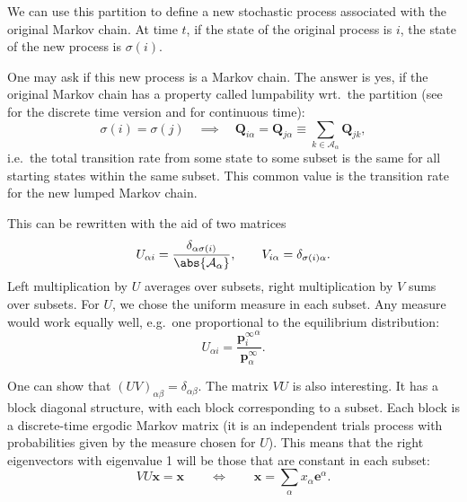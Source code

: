 \documentclass[9pt,twocolumn,twoside,lineno]{pnas-new}
\newcommand{\eg}{e.g.\ }
\newcommand{\ie}{i.e.\ }
\newcommand{\wrt}{wrt.\ }
\newcommand{\means}{\Longleftrightarrow}
\newcommand{\onev}{\mathbf{e}}
\newcommand{\MM}{\mathbf{Q}}
\newcommand{\prob}{\mathbf{p}}
\newcommand{\eq}{\prob^\infty}
\newcommand{\CA}{\mathcal{A}}
\begin{document}
\begin{strip}
We can use this partition to define a new stochastic process associated with the original Markov chain.
At time $t$, if the state of the original process is $i$, the state of the new process is $\sigma(i)$.

One may ask if this new process is a Markov chain.
The answer is yes, if the original Markov chain has a property called lumpability \wrt the partition
(see \cite[\S6.3]{kemeny1960finite} for the discrete time version and \cite{burke1958markovian,Ball1993Lumpability} for continuous time):
%
\begin{equation}\label{eq:lump}
  \sigma(i)=\sigma(j)
  \quad\implies \quad
  \MM_{i\alpha}=\MM_{j\alpha} \equiv \sum_{k\in\CA_\alpha} \MM_{jk},
\end{equation}
%
\ie the total transition rate from some state to some subset is the same for all starting states within the same subset.
This common value is the transition rate for the new lumped Markov chain.

This can be rewritten with the aid of two matrices
%
\begin{equation}\label{eq:lumpmats}
  U_{\alpha i} = \frac{\delta_{\alpha\sigma(i)}}{\abs{\CA_\alpha}},
  \qquad
  V_{i\alpha} = \delta_{\sigma(i)\alpha}.
\end{equation}
%
Left multiplication by $U$ averages over subsets, right multiplication by $V$ sums over subsets.
For $U$, we chose the uniform measure in each subset. Any measure would work equally well, \eg one proportional to the equilibrium distribution:
%
\begin{equation}\label{eq:altlumpmats}
  U_{\alpha i} = \frac{{\eq_i}^\alpha}{\eq_\alpha}.
\end{equation}
%

One can show that $(UV)_{\alpha\beta}=\delta_{\alpha\beta}$.
The matrix $VU$ is also interesting.
It has a block diagonal structure, with each block corresponding to a subset.
Each block is a discrete-time ergodic Markov matrix (it is an independent trials process with probabilities given by the measure chosen for $U$).
This means that the right eigenvectors with eigenvalue 1 will be those that are constant in each subset:
%
\begin{equation}\label{eq:setconst}
  VU\mathbf{x}=\mathbf{x}
  \qquad\means\qquad
  \mathbf{x} = \sum_\alpha x_\alpha \onev^\alpha.
\end{equation}
%


\end{strip}
\end{document}
